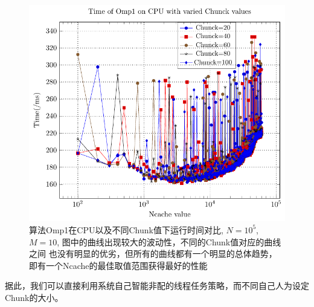 \begin{figure}[!t]
   \centering
   \includegraphics[width=\textwidth]{chap5/Figures/bsV1-CPU-Time-Chunck.pdf}
   \caption{算法Omp1在CPU以及不同Chunk值下运行时间对比, $N=10^5$, $M=10$, 图中的曲线出现较大的波动性，不同的Chunk值对应的曲线之间
   也没有明显的优劣，但所有的曲线都有一个明显的总体趋势，即有一个Ncache的最佳取值范围获得最好的性能}
   \label{fig:v1-cpu-chunck-Ncache}
\end{figure}
据此，我们可以直接利用系统自己智能非配的线程任务策略，而不同自己人为设定Chunk的大小。
